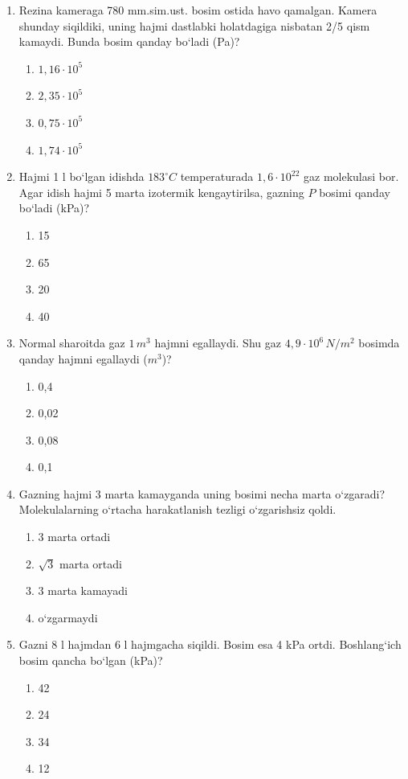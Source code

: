 \begin{enumerate}
\item Rezina kameraga 780 mm.sim.ust. bosim ostida havo qamalgan. Kamera shunday siqildiki, uning hajmi dastlabki holatdagiga nisbatan 2/5 qism kamaydi. Bunda bosim qanday bo‘ladi (Pa)?
\begin{enumerate}[label=\Alph*)]
\item $1,16 \cdot 10^5$
\item $2,35 \cdot 10^5$
\item $0,75 \cdot 10^5$
\item $1,74 \cdot 10^5$
\end{enumerate}

\item Hajmi 1 l bo‘lgan idishda $183^\circ C$ temperaturada $1,6 \cdot 10^{22}$ gaz molekulasi bor. Agar idish hajmi 5 marta izotermik kengaytirilsa, gazning $P$ bosimi qanday bo‘ladi (kPa)?
\begin{enumerate}[label=\Alph*)]
\item 15
\item 65
\item 20
\item 40
\end{enumerate}

\item Normal sharoitda gaz $1 \, m^3$ hajmni egallaydi. Shu gaz $4,9 \cdot 10^6 \, N/m^2$ bosimda qanday hajmni egallaydi ($m^3$)?
\begin{enumerate}[label=\Alph*)]
\item 0,4
\item 0,02
\item 0,08
\item 0,1
\end{enumerate}

\item Gazning hajmi 3 marta kamayganda uning bosimi necha marta o‘zgaradi? Molekulalarning o‘rtacha harakatlanish tezligi o‘zgarishsiz qoldi.
\begin{enumerate}[label=\Alph*)]
\item 3 marta ortadi
\item $\sqrt{3}$ marta ortadi
\item 3 marta kamayadi
\item o‘zgarmaydi
\end{enumerate}

\item Gazni 8 l hajmdan 6 l hajmgacha siqildi. Bosim esa 4 kPa ortdi. Boshlang‘ich bosim qancha bo‘lgan (kPa)?
\begin{enumerate}[label=\Alph*)]
\item 42
\item 24
\item 34
\item 12
\end{enumerate}


\end{enumerate}
